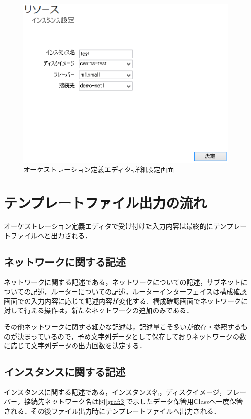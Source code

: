 \documentclass[mingoth]{kut-paper}		%
\begin{document}
			\begin{figure}[H]
				\begin{center}
					\includegraphics[scale=0.55]{Document/詳細設定画面.eps}
					\caption{オーケストレーション定義エディタ-詳細設定画面}
					\label{pic:4}
				\end{center}
			\end{figure}
	\section{テンプレートファイル出力の流れ}
	オーケストレーション定義エディタで受け付けた入力内容は最終的にテンプレートファイルへと出力される．
		\subsection{ネットワークに関する記述}
		ネットワークに関する記述である，ネットワークについての記述，サブネットについての記述，ルーターについての記述，ルーターインターフェイスは構成確認画面での入力内容に応じて記述内容が変化する．構成確認画面でネットワークに対して行える操作は，新たなネットワークの追加のみである．
		
		その他ネットワークに関する細かな記述は，記述量こそ多いが依存・参照するものが決まっているので，予め文字列データとして保存しておりネットワークの数に応じて文字列データの出力回数を決定する．
		\subsection{インスタンスに関する記述}
		インスタンスに関する記述である，インスタンス名，ディスクイメージ，フレーバー，接続先ネットワーク名は図\ref{graf:3}で示したデータ保管用Classへ一度保管される．その後ファイル出力時にテンプレートファイルへ出力される．
\end{document}

